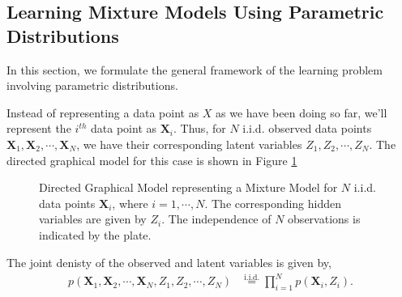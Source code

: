 \documentclass[twoside,11pt,a4paper]{book}
\newcommand{\data}[1]{\mathbf{#1}}
\begin{document}
\subsection{Learning Mixture Models Using Parametric Distributions}
In this section, we formulate the general framework of the learning problem involving parametric distributions.

Instead of representing a data point as $X$ as we have been doing so far, we'll represent the $i^{th}$ data point as $\data{X}_{i}$. Thus, for $N$ i.i.d. observed data points $\data{X}_{1}, \data{X}_{2}, \cdots, \data{X}_{N}$, we have their corresponding latent variables $Z_{1}, Z_{2}, \cdots, Z_{N}$. The directed graphical model for this case is shown in Figure \ref{fig:DAG-MM-IID}
\begin{figure}[ht]
\centering
{}
\caption{Directed Graphical Model representing a Mixture Model for $N$ i.i.d. data points $\data{X}_{i}$, where $i = 1, \cdots, N$. The corresponding hidden variables are given by $Z_{i}$. The independence of $N$ observations is indicated by the plate.}
\label{fig:DAG-MM-IID}
\end{figure}

The joint denisty of the observed and latent variables is given by,
\begin{align}
p(\data{X}_{1}, \data{X}_{2}, \cdots, \data{X}_{N},Z_{1}, Z_{2}, \cdots, Z_{N}) & \stackrel{\text{i.i.d.}}{=} \prod_{i=1}^{N} p(\data{X}_{i}, Z_{i}). \label{eq:jointdensityiid}
\end{align}
\end{document}
